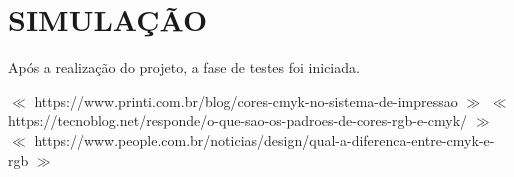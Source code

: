 \documentclass[12pt,a4paper,oneside]{abntex2}
\begin{document}
        \chapter{SIMULAÇÃO}
            Após a realização do projeto, a fase de testes foi iniciada. 

    \begin{thebibliography}{1}
              $\ll$ https://www.printi.com.br/blog/cores-cmyk-no-sistema-de-impressao $\gg$
              $\ll$ https://tecnoblog.net/responde/o-que-sao-os-padroes-de-cores-rgb-e-cmyk/ $\gg$
             $\ll$ https://www.people.com.br/noticias/design/qual-a-diferenca-entre-cmyk-e-rgb $\gg$
	\end{thebibliography}
 
\end{document}
